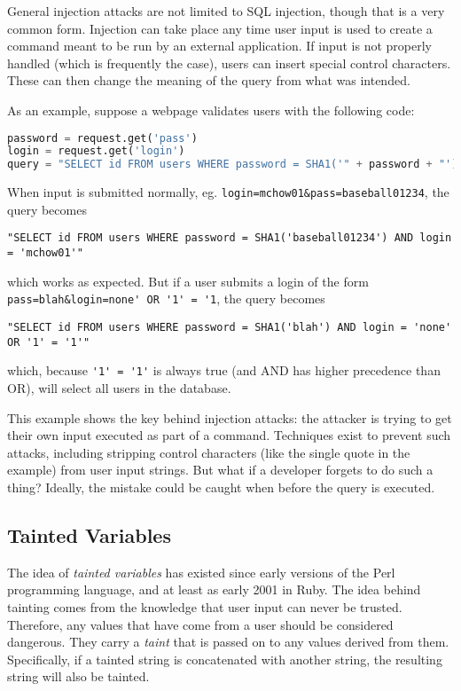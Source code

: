 \documentclass[twocolumn]{article}
\begin{document}
General injection attacks are not limited to SQL injection, though that is a very common form.  Injection can take place any time user input is used to create a command meant to be run by an external application.  If input is not properly handled (which is frequently the case), users can insert special control characters.  These can then change the meaning of the query from what was intended.

As an example, suppose a webpage validates users with the following code:
\begin{lstlisting}[language=Python, frame=single]
password = request.get('pass')
login = request.get('login')
query = "SELECT id FROM users WHERE password = SHA1('" + password + "') AND login = '" + login + "'"
\end{lstlisting}

When input is submitted normally, eg. \verb;login=mchow01&pass=baseball01234;, the query becomes
\begin{lstlisting}[frame=single]
"SELECT id FROM users WHERE password = SHA1('baseball01234') AND login = 'mchow01'"
\end{lstlisting}
which works as expected.  But if a user submits a login of the form
\verb;pass=blah&login=none' OR '1' = '1;, the query becomes
\begin{lstlisting}[frame=single]
"SELECT id FROM users WHERE password = SHA1('blah') AND login = 'none' OR '1' = '1'"
\end{lstlisting}
which, because \verb;'1' = '1'; is always true (and AND has higher precedence than OR), will select all users in the database.

This example shows the key behind injection attacks: the attacker is trying to get their own input executed as part of a command.  Techniques exist to prevent such attacks, including stripping control characters (like the single quote in the example) from user input strings.  But what if a developer forgets to do such a thing?  Ideally, the mistake could be caught when before the query is executed.

\subsection{Tainted Variables}
The idea of \textit{tainted variables} has existed since early versions of the Perl programming language, and at least as early 2001 in Ruby.\cite{perltaint,rubytaint}  The idea behind tainting comes from the knowledge that user input can never be trusted.  Therefore, any values that have come from a user should be considered dangerous.  They carry a \textit{taint} that is passed on to any values derived from them.  Specifically, if a tainted string is concatenated with another string, the resulting string will also be tainted.
\end{document}
